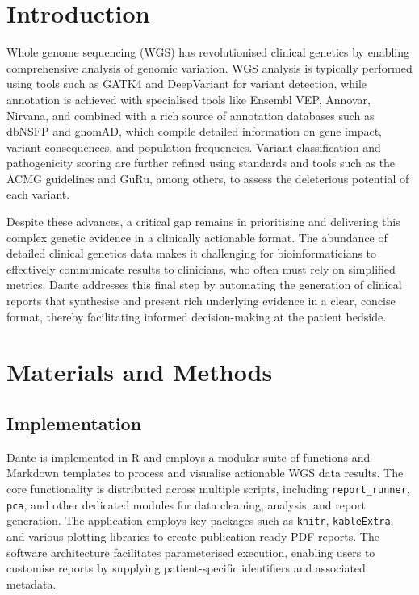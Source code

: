 \section{Introduction}
\noindent
Whole genome sequencing (WGS) has revolutionised clinical genetics by enabling comprehensive analysis of genomic variation. WGS analysis is typically performed using tools such as GATK4 and DeepVariant for variant detection, while annotation is achieved with specialised tools like Ensembl VEP, Annovar, Nirvana, and combined with a rich source of annotation databases such as dbNSFP and gnomAD, which compile detailed information on gene impact, variant consequences, and population frequencies. Variant classification and pathogenicity scoring are further refined using standards and tools such as the ACMG guidelines and GuRu, among others, to assess the deleterious potential of each variant.

Despite these advances, a critical gap remains in prioritising and delivering this complex genetic evidence in a clinically actionable format. The abundance of detailed clinical genetics data makes it challenging for bioinformaticians to effectively communicate results to clinicians, who often must rely on simplified metrics. Dante addresses this final step by automating the generation of clinical reports that synthesise and present rich underlying evidence in a clear, concise format, thereby facilitating informed decision-making at the patient bedside.


\section{Materials and Methods}
\subsection{Implementation}
\noindent
Dante is implemented in R and employs a modular suite of functions and Markdown templates to process and visualise actionable WGS data results. The core functionality is distributed across multiple scripts, including \texttt{report\_runner}, \texttt{pca}, and other dedicated modules for data cleaning, analysis, and report generation. The application employs key packages such as \texttt{knitr}, \texttt{kableExtra}, and various plotting libraries to create publication-ready PDF reports. The software architecture facilitates parameterised execution, enabling users to customise reports by supplying patient-specific identifiers and associated metadata.

